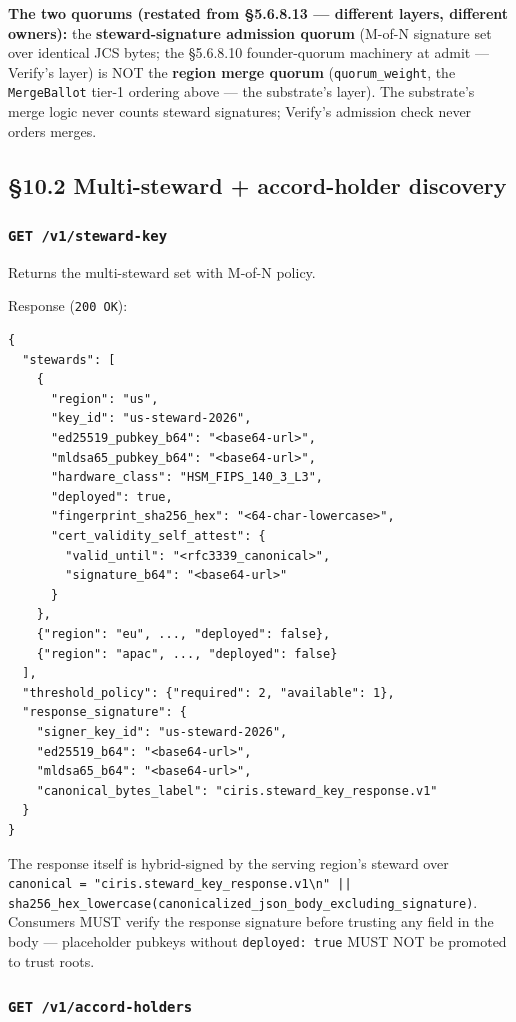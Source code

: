 \documentclass[10pt]{article}
\begin{document}
\textbf{The two quorums (restated from §5.6.8.13 — different layers, different owners):} the \textbf{steward-signature admission quorum} (M-of-N signature set over identical JCS bytes; the §5.6.8.10 founder-quorum machinery at admit — Verify's layer) is NOT the \textbf{region merge quorum} (\texttt{quorum\_weight}, the \texttt{MergeBallot} tier-1 ordering above — the substrate's layer). The substrate's merge logic never counts steward signatures; Verify's admission check never orders merges.


\subsection*{§10.2 Multi-steward + accord-holder discovery}


\subsubsection*{\texttt{GET /v1/steward-key}}


Returns the multi-steward set with M-of-N policy.


Response (\texttt{200 OK}):


\begin{lstlisting}
{
  "stewards": [
    {
      "region": "us",
      "key_id": "us-steward-2026",
      "ed25519_pubkey_b64": "<base64-url>",
      "mldsa65_pubkey_b64": "<base64-url>",
      "hardware_class": "HSM_FIPS_140_3_L3",
      "deployed": true,
      "fingerprint_sha256_hex": "<64-char-lowercase>",
      "cert_validity_self_attest": {
        "valid_until": "<rfc3339_canonical>",
        "signature_b64": "<base64-url>"
      }
    },
    {"region": "eu", ..., "deployed": false},
    {"region": "apac", ..., "deployed": false}
  ],
  "threshold_policy": {"required": 2, "available": 1},
  "response_signature": {
    "signer_key_id": "us-steward-2026",
    "ed25519_b64": "<base64-url>",
    "mldsa65_b64": "<base64-url>",
    "canonical_bytes_label": "ciris.steward_key_response.v1"
  }
}
\end{lstlisting}

The response itself is hybrid-signed by the serving region's steward over \texttt{canonical = "ciris.steward\_key\_response.v1\textbackslash{}n" || sha256\_hex\_lowercase(canonicalized\_json\_body\_excluding\_signature)}. Consumers MUST verify the response signature before trusting any field in the body — placeholder pubkeys without \texttt{deployed: true} MUST NOT be promoted to trust roots.


\subsubsection*{\texttt{GET /v1/accord-holders}}
\end{document}
